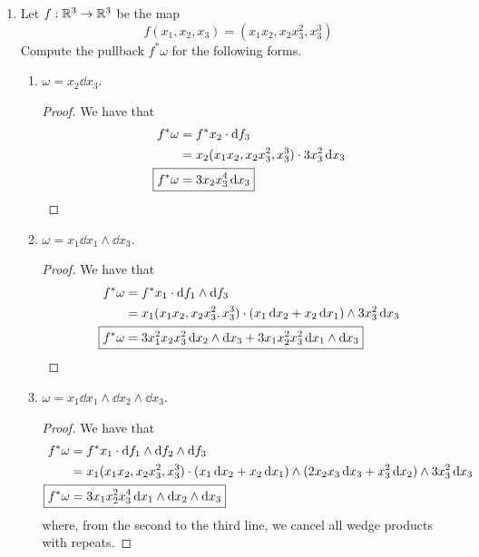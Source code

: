 \documentclass[../psets.tex]{subfiles}
\begin{document}
\begin{enumerate}[label={\textbf{2.6.\roman*.}}]
    \item Let $f:\mathbb{R}^3\to\mathbb{R}^3$ be the map
    \begin{equation*}
        f(x_1,x_2,x_3) = (x_1x_2,x_2x_3^2,x_3^3)
    \end{equation*}
    Compute the pullback $f^*\omega$ for the following forms.
    \begin{enumerate}
        \item $\omega=x_2\dd{x_3}$.
        \begin{proof}
            We have that
            \begin{align*}
                f^*\omega &= f^*x_2\cdot\dd{f_3}\\
                &= x_2(x_1x_2,x_2x_3^2,x_3^3)\cdot 3x_3^2\dd{x_3}\\
                \Aboxed{f^*\omega &= 3x_2x_3^4\dd{x_3}}
            \end{align*}
        \end{proof}
        \item $\omega=x_1\dd{x_1}\wedge\dd{x_3}$.
        \begin{proof}
            We have that
            \begin{align*}
                f^*\omega &= f^*x_1\cdot\dd{f_1}\wedge\dd{f_3}\\
                &= x_1(x_1x_2,x_2x_3^2,x_3^3)\cdot(x_1\dd{x_2}+x_2\dd{x_1})\wedge 3x_3^2\dd{x_3}\\
                \Aboxed{f^*\omega &= 3x_1^2x_2x_3^2\dd{x_2}\wedge\dd{x_3}+3x_1x_2^2x_3^2\dd{x_1}\wedge\dd{x_3}}
            \end{align*}
        \end{proof}
        \item $\omega=x_1\dd{x_1}\wedge\dd{x_2}\wedge\dd{x_3}$.
        \begin{proof}
            We have that
            \begin{align*}
                f^*\omega &= f^*x_1\cdot\dd f_1\wedge\dd f_2\wedge\dd f_3\\
                &= x_1(x_1x_2,x_2x_3^2,x_3^3)\cdot(x_1\dd{x_2}+x_2\dd{x_1})\wedge(2x_2x_3\dd{x_3}+x_3^2\dd{x_2})\wedge 3x_3^2\dd{x_3}\\
                \Aboxed{f^*\omega &= 3x_1x_2^2x_3^4\dd{x_1}\wedge\dd{x_2}\wedge\dd{x_3}}
            \end{align*}
            where, from the second to the third line, we cancel all wedge products with repeats.

\end{proof}
\end{enumerate}
\end{enumerate}
\end{document}
